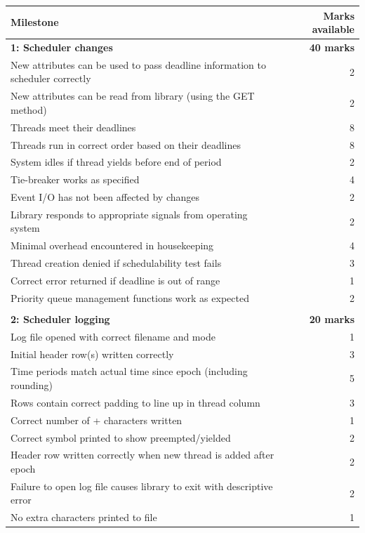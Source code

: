 \documentclass[12pt,a4paper]{article}
\begin{document}
\begin{longtable}{p{13cm} r}
    \toprule
    \textbf{Milestone} & \textbf{Marks available} \\
    \midrule

    \textbf{1: Scheduler changes} & \textbf{40 marks} \\
    New attributes can be used to pass deadline information to scheduler correctly & 2 \\
    New attributes can be read from library (using the GET method) & 2 \\
    Threads meet their deadlines & 8 \\
    Threads run in correct order based on their deadlines & 8 \\
    System idles if thread yields before end of period & 2 \\
    Tie-breaker works as specified & 4 \\
    Event I\slash O has not been affected by changes & 2 \\
    Library responds to appropriate signals from operating system & 2 \\
    Minimal overhead encountered in housekeeping & 4 \\
    Thread creation denied if schedulability test fails & 3 \\
    Correct error returned if deadline is out of range & 1 \\
    Priority queue management functions work as expected & 2 \\

    & \\
    \textbf{2: Scheduler logging} & \textbf{20 marks} \\
    Log file opened with correct filename and mode & 1 \\
    Initial header row(s) written correctly & 3 \\
    Time periods match actual time since epoch (including rounding) & 5 \\
    Rows contain correct padding to line up in thread column & 3 \\
    Correct number of + characters written & 1 \\
    Correct symbol printed to show preempted\slash yielded & 2 \\
    Header row written correctly when new thread is added after epoch & 2 \\
    Failure to open log file causes library to exit with descriptive error & 2 \\
    No extra characters printed to file & 1 \\

    \bottomrule
\end{longtable}
\end{document}
